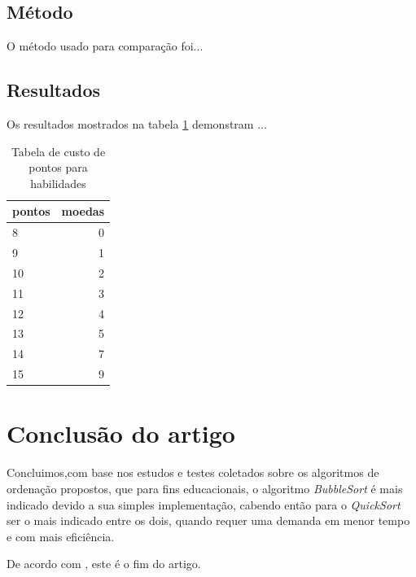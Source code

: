 \documentclass[a4paper,10pt]{article} %
\begin{document}
\subsection{Método}

O método usado para comparação foi...

\subsection{Resultados}

Os resultados mostrados na tabela \ref{tab:resultados} demonstram ...

\begin{table}
\begin{center}
 \caption{Tabela de custo de pontos para habilidades}
\begin{tabular}{|l|r|}
  \hline \hline
  pontos & moedas \\ \hline \hline
   8 & 0 \\ \hline
   9 & 1 \\ \hline
  10 & 2 \\ \hline
  11 & 3 \\ \hline
  12 & 4 \\ \hline
  13 & 5 \\ \hline
  14 & 7 \\ \hline
  15 & 9 \\ \hline \hline
\end{tabular} 
\label{tab:resultados}
\end{center}
\end{table}


\section{Conclusão do artigo}

    Concluimos,com base nos estudos e testes coletados sobre os algoritmos de ordenação propostos, que para fins educacionais, o algoritmo \textit{BubbleSort} é mais indicado devido a sua simples implementação, cabendo então para o \textit{QuickSort} ser o mais indicado entre os dois, quando requer uma demanda em menor tempo e com mais eficiência.

De acordo com \cite{Benante2008phd}, este é o fim do artigo.
\end{document}
